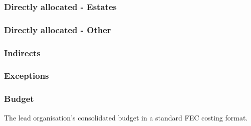 \documentclass[12pt]{article}
\begin{document}
\subsubsection{Directly allocated - Estates}

\subsubsection{Directly allocated - Other}

\subsubsection{Indirects}

\subsubsection{Exceptions}

\subsubsection{Budget}

The lead organisation's consolidated budget in a standard FEC costing format.



\end{document}
